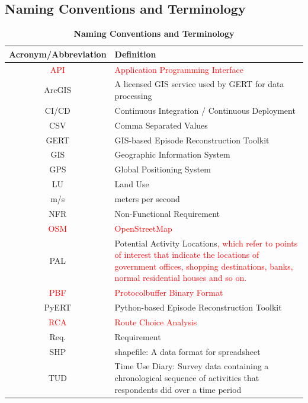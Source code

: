 \documentclass[12pt, titlepage]{article}
\begin{document}
\subsection{Naming Conventions and Terminology}
\begin{table}[h]
\centering
\begin{tabular}{|c|p{10cm}|}
 \hline
 {\bf Acronym/Abbreviation} & {\bf Definition} \\
 \hline
 \textcolor{red}{API} & \textcolor{red}{Application Programming Interface} \\
 \hline
 ArcGIS & A licensed GIS service used by GERT for data processing \\
 \hline
 CI/CD & Continuous Integration / Continuous Deployment\\
 \hline
 CSV & Comma Separated Values \\
 \hline
 GERT & GIS-based Episode Reconstruction Toolkit  \\ 
 \hline
 GIS & Geographic Information System \\
 \hline
 GPS & Global Positioning System \\
 \hline
 LU & Land Use \\ 
 \hline
 m/s & meters per second\\
 \hline
 NFR & Non-Functional Requirement  \\
 \hline
 \textcolor{red}{OSM} & \textcolor{red}{OpenStreetMap} \\
 \hline 
 PAL & Potential Activity Locations\textcolor{red}{, which refer to points of interest that indicate the locations of government offices, shopping destinations, banks, normal residential houses and so on.} \\ 
 \hline
 \textcolor{red}{PBF} & \textcolor{red}{Protocolbuffer Binary Format} \\
 \hline
 PyERT & Python-based Episode Reconstruction Toolkit  \\ 
 \hline
 \textcolor{red}{RCA} & \textcolor{red}{Route Choice Analysis} \\
 \hline
 Req. & Requirement  \\
 \hline
 SHP & shapefile: A data format for spreadsheet \\ 
 \hline
 TUD & Time Use Diary:  Survey data containing a chronological sequence of activities that respondents did over a time period\\
 \hline
\end{tabular}
\caption{\bf Naming Conventions and Terminology}
\end{table}
\end{document}
